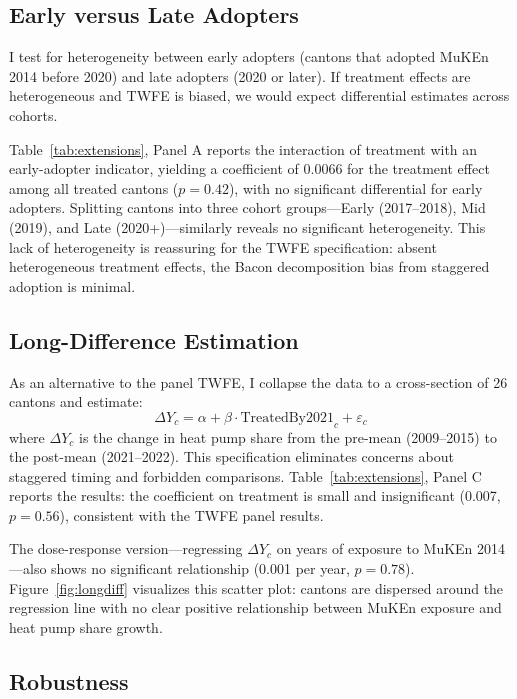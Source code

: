 \documentclass[12pt]{article}
\begin{document}
\subsection{Early versus Late Adopters}

I test for heterogeneity between early adopters (cantons that adopted MuKEn 2014 before 2020) and late adopters (2020 or later). If treatment effects are heterogeneous and TWFE is biased, we would expect differential estimates across cohorts.

Table~\ref{tab:extensions}, Panel A reports the interaction of treatment with an early-adopter indicator, yielding a coefficient of 0.0066 for the treatment effect among all treated cantons ($p = 0.42$), with no significant differential for early adopters. Splitting cantons into three cohort groups---Early (2017--2018), Mid (2019), and Late (2020+)---similarly reveals no significant heterogeneity. This lack of heterogeneity is reassuring for the TWFE specification: absent heterogeneous treatment effects, the Bacon decomposition bias from staggered adoption is minimal.

\subsection{Long-Difference Estimation}

As an alternative to the panel TWFE, I collapse the data to a cross-section of 26 cantons and estimate:
\begin{equation}
    \Delta Y_c = \alpha + \beta \cdot \text{TreatedBy2021}_c + \varepsilon_c
\end{equation}
where $\Delta Y_c$ is the change in heat pump share from the pre-mean (2009--2015) to the post-mean (2021--2022). This specification eliminates concerns about staggered timing and forbidden comparisons. Table~\ref{tab:extensions}, Panel C reports the results: the coefficient on treatment is small and insignificant (0.007, $p = 0.56$), consistent with the TWFE panel results.

The dose-response version---regressing $\Delta Y_c$ on years of exposure to MuKEn 2014---also shows no significant relationship (0.001 per year, $p = 0.78$). Figure~\ref{fig:longdiff} visualizes this scatter plot: cantons are dispersed around the regression line with no clear positive relationship between MuKEn exposure and heat pump share growth.

\subsection{Robustness}
\end{document}
